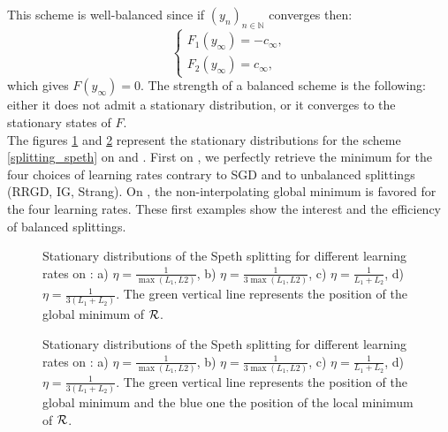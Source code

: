 This scheme is well-balanced since if $(y_n)_{n\in \mathbb{N}}$ converges then:
\begin{equation*}
	\left\{
	\begin{array}{ll}
		F_1(y_{\infty})=-c_{\infty}, \\
		F_2(y_{\infty})=c_{\infty},
	\end{array}
	\right.
\end{equation*}
which gives $F(y_{\infty})=0$. The strength of a balanced scheme is the following: either it does not admit a stationary distribution, or it converges to the stationary states of $F$.\\
The figures \ref{speth_ex1} and \ref{speth_ex2} represent the stationary distributions for the scheme \eqref{splitting_speth} on \exOne and \exTwo. First on \exOne, we perfectly retrieve the minimum for the four choices of learning rates contrary to SGD and to unbalanced splittings (RRGD, IG, Strang). On \exTwo, the non-interpolating global minimum is favored for the four learning rates. These first examples show the interest and the efficiency of balanced splittings. 

\begin{figure}[h!]
	\centering
	\scalebox{0.45}{}
	\caption{Stationary distributions of the Speth splitting for different learning rates on \exOne: a) $\eta=\frac{1}{\max(L_1,L2)}$, b) $\eta=\frac{1}{3\max(L_1,L2)}$, c) $\eta=\frac{1}{L_1+L_2}$, d) $\eta=\frac{1}{3(L_1+L_2)}$. The green vertical line represents the position of the global minimum of $\mathcal{R}$.}
	\label{speth_ex1}
\end{figure}

\begin{figure}[h!]
	\centering
	\scalebox{0.45}{}
	\caption{Stationary distributions of the Speth splitting for different learning rates on \exTwo: a) $\eta=\frac{1}{\max(L_1,L2)}$, b) $\eta=\frac{1}{3\max(L_1,L2)}$, c) $\eta=\frac{1}{L_1+L_2}$, d) $\eta=\frac{1}{3(L_1+L_2)}$. The green vertical line represents the position of the global minimum and the blue one the position of the local minimum of $\mathcal{R}$.}
	\label{speth_ex2}
\end{figure}

